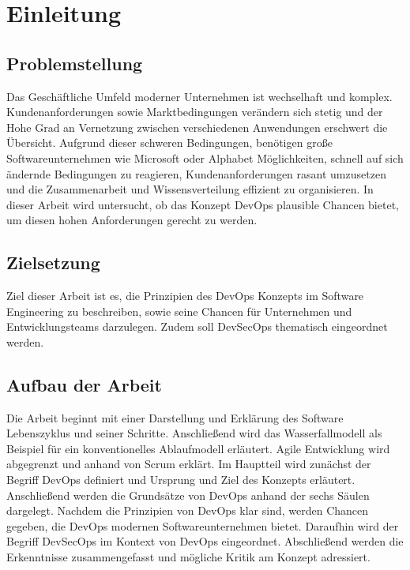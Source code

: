 \section{Einleitung}

\subsection{Problemstellung}

Das Geschäftliche Umfeld moderner Unternehmen ist wechselhaft und komplex.
Kundenanforderungen sowie Marktbedingungen verändern sich stetig und der Hohe Grad an
Vernetzung zwischen verschiedenen Anwendungen erschwert die Übersicht.
Aufgrund dieser schweren Bedingungen, benötigen große Softwareunternehmen wie
Microsoft oder Alphabet Möglichkeiten, schnell auf sich ändernde Bedingungen zu reagieren,
Kundenanforderungen rasant umzusetzen und die Zusammenarbeit und Wissensverteilung effizient
zu organisieren. In dieser Arbeit wird untersucht, ob das Konzept DevOps plausible
Chancen bietet, um diesen hohen Anforderungen gerecht zu werden.

\subsection{Zielsetzung}

Ziel dieser Arbeit ist es, die Prinzipien des DevOps Konzepts im Software Engineering
zu beschreiben, sowie seine Chancen für Unternehmen und Entwicklungsteams darzulegen.
Zudem soll DevSecOps thematisch eingeordnet werden. 

\subsection{Aufbau der Arbeit}

Die Arbeit beginnt mit einer Darstellung und Erklärung des Software Lebenszyklus und seiner
Schritte. Anschließend wird das Wasserfallmodell als Beispiel für ein konventionelles Ablaufmodell
erläutert. Agile Entwicklung wird abgegrenzt und anhand von Scrum erklärt.
Im Hauptteil wird zunächst der Begriff DevOps definiert und Ursprung und Ziel des Konzepts
erläutert. Anschließend werden die Grundsätze von DevOps anhand der sechs Säulen dargelegt.
Nachdem die Prinzipien von DevOps klar sind, werden Chancen gegeben, die DevOps modernen
Softwareunternehmen bietet. Daraufhin wird der Begriff DevSecOps im Kontext von DevOps eingeordnet.
Abschließend werden die Erkenntnisse zusammengefasst und mögliche Kritik am Konzept adressiert.